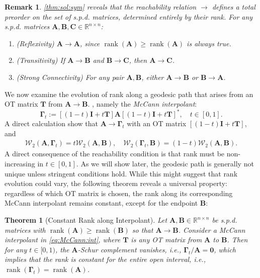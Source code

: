\documentclass[noinfoline]{imsart}\setcounter{tocdepth}{2}
\renewcommand{\b}[1]{\mathbb{#1}} %
\newcommand{\m}[1]{\mathbf{#1}} %
\renewcommand{\c}[1]{\mathcal{#1}} %
\DeclareMathOperator*{\rk}{rank}
\theoremstyle{plain}
\newtheorem{theorem}{Theorem}[section]
\newtheorem{remark}{Remark}[section]
\begin{document}
\begin{remark}
\cref{thm:sol:sym} reveals that the \emph{reachability} relation $\to$ defines a \emph{total preorder} on the set of s.p.d. matrices, determined entirely by their rank. For any s.p.d. matrices $\m{A}, \m{B}, \m{C} \in \b{R}^{n \times n}$:
\begin{enumerate}[leftmargin = *]
    \item (Reflexivity) $\m{A} \rightarrow \m{A}$, since $\rk(\m{A}) \ge \rk(\m{A})$ is always true.
    \item (Transitivity) If $\m{A} \rightarrow \m{B}$ and $\m{B} \rightarrow \m{C}$, then $\m{A} \rightarrow \m{C}$.
    \item (Strong Connectivity) For any pair $\m{A}, \m{B}$, either $\m{A} \rightarrow \m{B}$ or $\m{B} \rightarrow \m{A}$. 
\end{enumerate} 
\end{remark}

We now examine the evolution of rank along a geodesic path that arises from an OT matrix $\m{T}$ from $\m{A} \rightarrow \m{B}$. , namely the \emph{McCann interpolant}:
\begin{equation}\label{eq:McCann:int}
    \m{\Gamma}_{t} := [(1-t) \m{I} + t \m{T}] \m{A} [(1-t) \m{I} + t \m{T}]^{*}, \quad t \in [0, 1].
\end{equation}
A direct calculation show that $\m{A} \rightarrow \m{\Gamma}_{t}$ with an OT matrix $[(1-t) \m{I} + t \m{T}]$, and 
\begin{align*}
    \c{W}_{2}(\m{A}, \m{\Gamma}_{t}) = t \c{W}_{2}(\m{A}, \m{B}), \quad \c{W}_{2}(\m{\Gamma}_{t}, \m{B}) = (1-t) \c{W}_{2}(\m{A}, \m{B}).
\end{align*}
A direct consequence of the reachability condition is that rank must be non-increasing in $t \in [0, 1]$. As we will show later, the geodesic path is generally not unique unless stringent conditions hold. While this might suggest that rank evolution could vary, the following theorem reveals a universal property: regardless of which OT matrix is chosen, the rank along its corresponding McCann interpolant remains constant, except for the endpoint $\m{B}$:

\begin{theorem}[Constant Rank along Interpolant]\label{thm:geo:Schur}
Let $\m{A}, \m{B} \in \b{R}^{n \times n}$ be s.p.d. matrices with $\rk(\m{A}) \geq \rk(\m{B})$ so that $\m{A} \to \m{B}$. Consider a McCann interpolant in \eqref{eq:McCann:int}, where $\m{T}$ is any OT matrix from $\m{A}$ to $\m{B}$. Then for any $t \in [0, 1)$, the $\m{A}$-Schur complement vanishes, i.e., $\m{\Gamma}_{t}/\m{A} = \m{0}$, which implies that the rank is constant for the entire open interval, i.e., $\rk(\m{\Gamma}_{t}) = \rk (\m{A})$.
\end{theorem}
\end{document}
